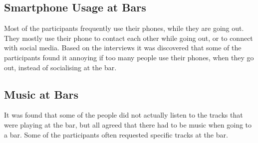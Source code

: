 \subsection{Smartphone Usage at Bars}
Most of the participants frequently use their phones, while they are going out. They mostly use their phone to contact each other while going out, or to connect with social media.
Based on the interviews it was discovered that some of the participants found it annoying if too many people use their phones, when they go out, instead of socialising at the bar.

\subsection{Music at Bars}
It was found that some of the people did not actually listen to the tracks that were playing at the bar, but all agreed that there had to be music when going to a bar. Some of the participants often requested specific tracks at the bar.
